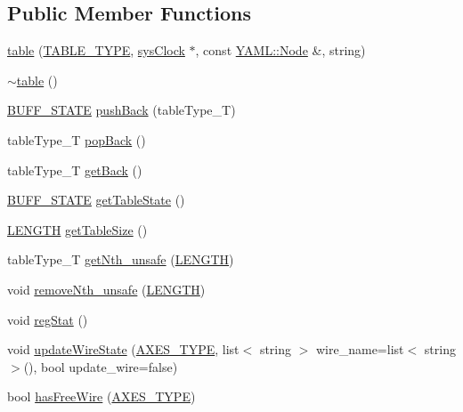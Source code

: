 \subsection*{Public Member Functions}
\begin{DoxyCompactItemize}
\item 
\hyperlink{classtable_ac3da89bda078a7aa2c6805866bb4399c}{table} (\hyperlink{table_8h_ae42c42cf2da8a8d43c157d91ad4f3158}{TABLE\_\-TYPE}, \hyperlink{classsysClock}{sysClock} $\ast$, const \hyperlink{classYAML_1_1Node}{YAML::Node} \&, string)
\item 
\hyperlink{classtable_a2d08b3fd77985dc4dc610de35946a293}{$\sim$table} ()
\item 
\hyperlink{global_2global_8h_a8bd4ea2582a6025c1cfe99bf9947489c}{BUFF\_\-STATE} \hyperlink{classtable_a8810ab4eeba365c36687d4c6c02fe1f6}{pushBack} (tableType\_\-T)
\item 
tableType\_\-T \hyperlink{classtable_a2fbaa1bd5450556efff7dddd33e5b6d1}{popBack} ()
\item 
tableType\_\-T \hyperlink{classtable_a9a0482a7594596a539e815bbe9c6aa7b}{getBack} ()
\item 
\hyperlink{global_2global_8h_a8bd4ea2582a6025c1cfe99bf9947489c}{BUFF\_\-STATE} \hyperlink{classtable_abab8f70b8b32bb7342f5107edb328d18}{getTableState} ()
\item 
\hyperlink{binaryTranslator_2global_8h_a9f35cc405c37836572563f16d0302ba6}{LENGTH} \hyperlink{classtable_af9c07419ae48bd029f03a9e7ca29c43f}{getTableSize} ()
\item 
tableType\_\-T \hyperlink{classtable_a20191b8e05f6882b38655c5fffb42389}{getNth\_\-unsafe} (\hyperlink{binaryTranslator_2global_8h_a9f35cc405c37836572563f16d0302ba6}{LENGTH})
\item 
void \hyperlink{classtable_ae5c57c137b681a823a1bb0d830520e82}{removeNth\_\-unsafe} (\hyperlink{binaryTranslator_2global_8h_a9f35cc405c37836572563f16d0302ba6}{LENGTH})
\item 
void \hyperlink{classtable_af252520f4025cbc80e7bff8d9b811ba7}{regStat} ()
\item 
void \hyperlink{classtable_a03164f903a848e731e1b934a533896b4}{updateWireState} (\hyperlink{binaryTranslator_2global_8h_a94b8423a23b95a7adac22848b81e7c0c}{AXES\_\-TYPE}, list$<$ string $>$ wire\_\-name=list$<$ string $>$(), bool update\_\-wire=false)
\item 
bool \hyperlink{classtable_aa04af14b4eceb2ac2653364d1c1217b6}{hasFreeWire} (\hyperlink{binaryTranslator_2global_8h_a94b8423a23b95a7adac22848b81e7c0c}{AXES\_\-TYPE})

\end{DoxyCompactItemize}
